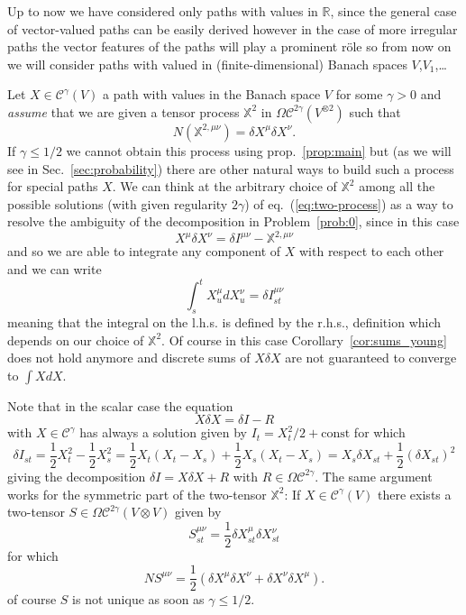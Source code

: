 \documentclass[a4paper,12pt,reqno]{amsproc}
\newcommand{\der}{\delta\!}
\newcommand{\XX}{\mathbb{X}}
\newcommand{\NN}{N}
\newcommand{\CC}{\mathcal{C}}
\newcommand{\OCC}{\Omega \mathcal{C}}
\begin{document}
Up to now we have considered only paths with values in $\mathbb{R}$,
since the general case of vector-valued paths can be easily derived
however in the case of more irregular paths the vector features of
the paths will play a prominent r\"ole so from now on we will consider
paths with valued in (finite-dimensional) Banach spaces $V$,$V_1$,\dots

Let $X \in \CC^\gamma(V)$ a path with values in the Banach space $V$
for some $\gamma > 0$ and \emph{assume} that we are given a tensor
process $\mathbb{X}^2$ in
$\OCC^{2\gamma}(V^{\otimes 2})$ such that
\begin{equation}
\label{eq:two-process}
  \NN (\XX^{2,\mu\nu}) =  \der X^\mu \der X^\nu.
\end{equation}
If $\gamma \le 1/2$ we cannot obtain this process using
prop.~\ref{prop:main} but (as we will see in Sec.~\ref{sec:probability}) there are other natural ways
to build such a process for special paths $X$. We can think at the
arbitrary choice of $\mathbb{X}^2$ among all the possible solutions
(with given regularity $2\gamma$) of eq.~(\ref{eq:two-process}) as a
way to resolve the ambiguity of the decomposition  in
Problem~\ref{prob:0}, since in this case
$$
X^\mu \der X^\nu = \der I^{\mu\nu} - \mathbb{X}^{2,\mu\nu}
$$
and so we are able to integrate any component of $X$ with respect to
each other and we can write
$$
\int_s^t X_u^\mu dX^\nu_u = \der I^{\mu\nu}_{st}
$$
meaning that the integral on the l.h.s. is defined by the r.h.s.,
definition which depends on our choice of $\mathbb{X}^2$. Of course
in this case Corollary~\ref{cor:sums_young} does not hold anymore and discrete
sums of $X\der X$ are not guaranteed to converge to $\int X dX$.

Note that in the scalar case the equation
$$
X \der X = \der I - R
$$
with $X \in \CC^\gamma$
has always a solution given by 
$
I_{t} = X_t^2/2 + \text{const} 
$
for which  
$$
\der I_{st} = \frac{1}{2}X_t^2 - \frac{1}{2} X_s^2 =\frac{1}{2}
X_t(X_t-X_s) + \frac{1}{2} X_s(X_t-X_s) = X_s \der
X_{st} + \frac{1}{2} (\der X_{st})^2  
$$
giving the decomposition $\der I = X \der X + R$ with $R \in
\OCC^{2\gamma}$.
The same argument works for the symmetric part of the two-tensor
$\mathbb{X}^2$: If $X \in \CC^\gamma(V)$ there exists a two-tensor $S \in \OCC^{2\gamma}(V
\otimes V)$ given by
$$
S_{st}^{\mu\nu} = \frac{1}{2}\der X_{st}^\mu \der X_{st}^\nu
$$
for which
$$
\NN  S^{\mu\nu} = \frac{1}{2} (\der X^\mu \der X^\nu + \der X^\nu \der X^\mu) .
$$
of course $S$ is not unique as soon as $\gamma \le 1/2$.
\end{document}
